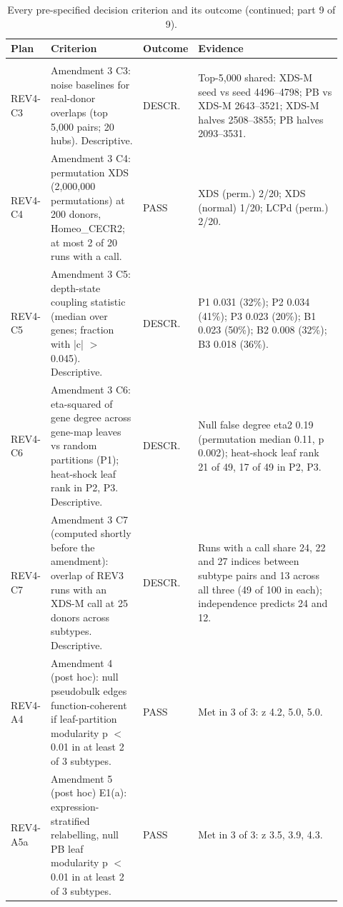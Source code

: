 \begin{table}[p]
\centering\scriptsize
\setlength{\tabcolsep}{2.5pt}\renewcommand{\arraystretch}{1.1}
\caption{Every pre-specified decision criterion and its outcome (continued; part 9 of 9).}\label{tab:criteria9}
\begin{tabular}{@{}>{\raggedright\arraybackslash}p{0.100\linewidth}>{\raggedright\arraybackslash}p{0.285\linewidth}>{\raggedright\arraybackslash}p{0.085\linewidth}>{\raggedright\arraybackslash}p{0.450\linewidth}@{}}
\toprule
Plan & Criterion & Outcome & Evidence \\
\midrule
\multicolumn{4}{@{}>{\raggedright\arraybackslash}p{0.90\linewidth}}{\textbf{Plan 5 (REV4\_PREREG), with amendments 1--5} (continued)} \\
\cmidrule(lr){1-4}
REV4-C3 & Amendment 3 C3: noise baselines for real-donor overlaps (top 5,000 pairs; 20 hubs). Descriptive. & DESCR. & Top-5,000 shared: XDS-M seed vs seed 4496--4798; PB vs XDS-M 2643--3521; XDS-M halves 2508--3855; PB halves 2093--3531. \\
REV4-C4 & Amendment 3 C4: permutation XDS (2,000,000 permutations) at 200 donors, Homeo\_CECR2; at most 2 of 20 runs with a call. & PASS & XDS (perm.) 2/20; XDS (normal) 1/20; LCPd (perm.) 2/20. \\
REV4-C5 & Amendment 3 C5: depth-state coupling statistic (median over genes; fraction with |c| $>$ 0.045). Descriptive. & DESCR. & P1 0.031 (32\%); P2 0.034 (41\%); P3 0.023 (20\%); B1 0.023 (50\%); B2 0.008 (32\%); B3 0.018 (36\%). \\
REV4-C6 & Amendment 3 C6: eta-squared of gene degree across gene-map leaves vs random partitions (P1); heat-shock leaf rank in P2, P3. Descriptive. & DESCR. & Null false degree eta2 0.19 (permutation median 0.11, p 0.002); heat-shock leaf rank 21 of 49, 17 of 49 in P2, P3. \\
REV4-C7 & Amendment 3 C7 (computed shortly before the amendment): overlap of REV3 runs with an XDS-M call at 25 donors across subtypes. Descriptive. & DESCR. & Runs with a call share 24, 22 and 27 indices between subtype pairs and 13 across all three (49 of 100 in each); independence predicts 24 and 12. \\
REV4-A4 & Amendment 4 (post hoc): null pseudobulk edges function-coherent if leaf-partition modularity p $<$ 0.01 in at least 2 of 3 subtypes. & PASS & Met in 3 of 3: z 4.2, 5.0, 5.0. \\
REV4-A5a & Amendment 5 (post hoc) E1(a): expression-stratified relabelling, null PB leaf modularity p $<$ 0.01 in at least 2 of 3 subtypes. & PASS & Met in 3 of 3: z 3.5, 3.9, 4.3. \\

\end{tabular}
\end{table}
